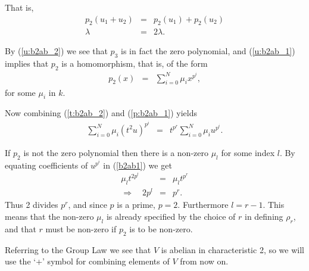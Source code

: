 That is,
\begin{eqnarray}
\label{u:b2ab_1}
p_2(u_1 + u_2) &=& p_2(u_1) + p_2(u_2) \\
\label{u:b2ab_2}
\lambda &=& 2\lambda.
\end{eqnarray}

By (\ref{u:b2ab_2}) we see that $p_3$ is in fact the zero polynomial, and (\ref{u:b2ab_1}) implies that $p_2$ is a homomorphism, that is, of the form
\begin{eqnarray}
\label{p:b2ab_1}
p_2(x) &=& \sum_{i=0}^N \mu_i x^{p^i},
\end{eqnarray}
for some $\mu_i$ in $k$.

Now combining (\ref{t:b2ab_2}) and (\ref{p:b2ab_1}) yields
\begin{eqnarray}
\label{b2ab1}
\sum_{i=0}^N \mu_i (t^2u)^{p^i} &=& t^{p^r}\sum_{i=0}^N \mu_i u^{p^i}.
\end{eqnarray}

If $p_2$ is not the zero polynomial then there is a non-zero $\mu_l$ for some index $l$. By equating coefficients of $u^{p^i}$ in (\ref{b2ab1}) we get
\begin{eqnarray*}
\mu_lt^{2p^l} &=& \mu_lt^{p^r} \\
\Longrightarrow\quad 2p^l &=& p^r.
\end{eqnarray*}
Thus 2 divides $p^r$, and since $p$ is a prime, $p=2$. Furthermore $l=r-1$. This means that the non-zero $\mu_l$ is already specified by the choice of $r$ in defining $\rho_r$, and that $r$ must be non-zero if $p_2$ is to be non-zero.

Referring to the Group Law we see that $V$ is abelian in characteristic 2, so we will use the `+' symbol for combining elements of $V$ from now on.

